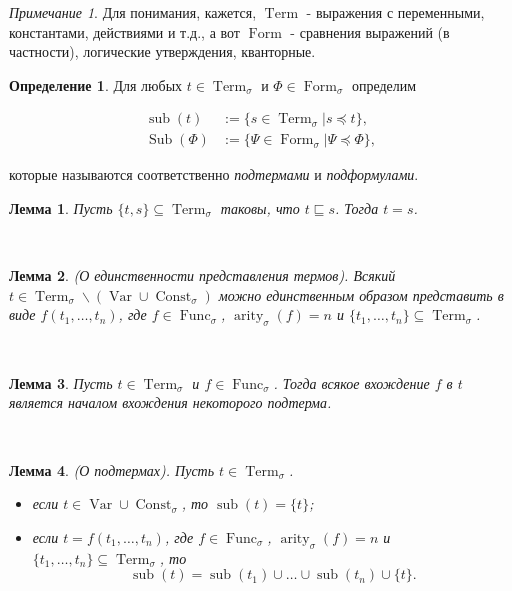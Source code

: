 \documentclass[a4paper,100pt]{article}
\theoremstyle{indented}
\newtheorem{lemma}{Лемма}
\theoremstyle{definition}
\newtheorem{defn}{Определение}
\theoremstyle{remark}
\newtheorem{remark}{Примечание}
\DeclareMathOperator{\form}{Form}
\DeclareMathOperator{\Func}{Func}
\DeclareMathOperator{\Const}{Const}
\DeclareMathOperator{\arity}{arity}
\DeclareMathOperator{\Var}{Var}
\DeclareMathOperator{\Term}{Term}
\DeclareMathOperator{\sub}{sub}
\DeclareMathOperator{\Sub}{Sub}
\begin{document}
\begin{remark}
  Для понимания, кажется, $\Term$ - выражения с переменными, константами, действиями и т.д., а вот $\form$ - сравнения выражений (в частности), логические утверждения, кванторные.
\end{remark}

\begin{defn}
  Для любых $t\in \Term_\sigma$ и $\Phi\in \form_\sigma$ определим 

  \begin{equation*}
    \begin{aligned}
      \sub(t) & := \{s \in \Term_\sigma | s\preccurlyeq t\}, \\
      \Sub(\Phi) & := \{\Psi \in \form_\sigma | \Psi\preccurlyeq \Phi\}, 
    \end{aligned}
  \end{equation*}

  которые называются соответственно \textit{подтермами} и \textit{подформулами}.
\end{defn}

\begin{lemma}
  Пусть $\{t, s\}\subseteq \Term_\sigma$ таковы, что $t\sqsubseteq s$. Тогда $t=s$. 
\end{lemma} \

\begin{lemma}
  (О единственности представления термов). Всякий $t\in \Term_\sigma \backslash (\Var\cup\Const_\sigma)$ можно единственным образом представить в виде $f(t_1, \ldots, t_n)$, где $f\in \Func_\sigma$, $\arity_\sigma(f)=n$ и $\{t_1, \ldots, t_n\}\subseteq \Term_\sigma$. 
\end{lemma} \

\begin{lemma}
  Пусть $t\in \Term_\sigma$ и $f\in \Func_\sigma$. Тогда всякое вхождение $f$ в $t$ является началом вхождения некоторого подтерма.
\end{lemma} \

\begin{lemma}
  (О подтермах). Пусть $t\in\Term_\sigma$. 

  \begin{itemize}
    \item если $t\in \Var \cup \Const_\sigma$, то $\sub(t)=\{t\}$;
    \item если $t=f(t_1, \ldots, t_n)$, где $f\in \Func_\sigma$, $\arity_\sigma(f)=n$ и $\{t_1, \ldots, t_n\}\subseteq \Term_\sigma$, то 
    \[
      \sub(t)=\sub(t_1)\cup\ldots\cup \sub(t_n)\cup \{ t \}. 
    \]
  \end{itemize}
\end{lemma} \ 
\end{document}
